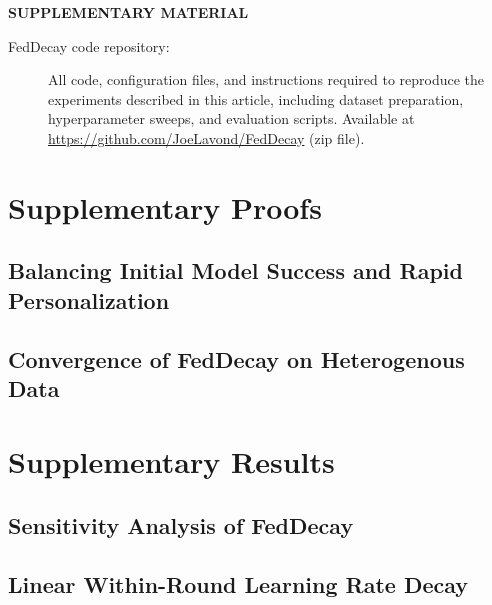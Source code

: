 \documentclass[12pt]{article}
\begin{document}
    \label{supplementary-material}
    \bigskip
    \begin{center}
    {\large\bf SUPPLEMENTARY MATERIAL}
    \end{center}

    \begin{description}

    \item[FedDecay code repository:] All code, configuration files, and instructions
    required to reproduce the experiments described in this article, including dataset
    preparation, hyperparameter sweeps, and evaluation scripts.
    Available at \url{https://github.com/JoeLavond/FedDecay} (zip file).

    \end{description}

    
    \appendix

    \section{Supplementary Proofs}

        \subsection{Balancing Initial Model Success and Rapid Personalization}
        \label{pf: decay-pf-taylor}
        

        \subsection{Convergence of FedDecay on Heterogenous Data}
        \label{pf: decay-pf-conv}
        

    \section{Supplementary Results}

        \subsection{Sensitivity Analysis of FedDecay}
        \label{app: decay-app-sens}
        

        \subsection{Linear Within-Round Learning Rate Decay}
        \label{app: decay-app-scheme}
        
\end{document}
